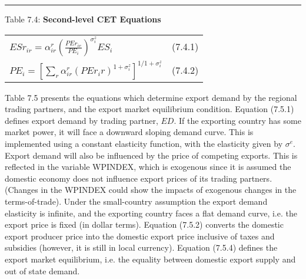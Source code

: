 \documentclass[12pt]{article}
\begin{document}
\noindent\rule{\linewidth}{0.4pt}
\begin{center}
\begin{large}
{\centering Table 7.4: \textbf{Second-level CET Equations} \par}


\begin{tabular}{>{\raggedright}p{} l}


$ESr_{ir} = \alpha^r_{ir}\left(\frac{PEr_{ir}}{PE_i}\right)^{\sigma^z_i}ES_i$ & (7.4.1)\\[15pt]

$PE_i = \left[\displaystyle\sum_r\alpha^r_{ir}\left(PEr_ir\right)^{1+{\sigma^z_i}}\right]^{1/{1+{\sigma^z_i}}}$ & (7.4.2)\\[20pt]

\hline
\end{tabular}
\end{large}
\end{center}

Table 7.5 presents the equations which determine export demand by the regional trading partners, and the export market equilibrium condition. Equation (7.5.1) defines export demand by trading partner, $ED$. If the exporting country has some market power, it will face a downward sloping demand curve. This is implemented using a constant elasticity function, with the elasticity given by $\sigma^e$. Export demand will also be influenced by the price of competing exports. This is reflected in the variable WPINDEX, which is exogenous since it is assumed the domestic economy does not influence export prices of its trading partners. (Changes in the WPINDEX could show the impacts of exogenous changes in the terms-of-trade). Under the small-country assumption the export demand elasticity is infinite, and the exporting country faces a flat demand curve, i.e. the export price is fixed (in dollar terms). Equation (7.5.2) converts the domestic export producer price into the domestic export price inclusive of taxes and subsidies (however, it is still in local currency). Equation (7.5.4) defines the export market equilibrium, i.e. the equality between domestic export supply and out of state demand.
\end{document}
